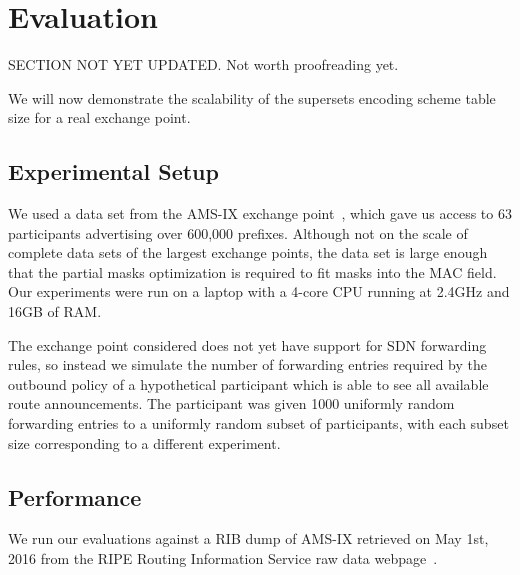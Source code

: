 \section{Evaluation}
SECTION NOT YET UPDATED. Not worth proofreading yet. 

We will now demonstrate the scalability of the supersets encoding scheme table size for a real exchange point. 

\subsection{Experimental Setup}
We used a data set from the AMS-IX exchange point~\cite{ams-ix}, which gave us access to 63 participants advertising over 600,000 prefixes. Although not on the scale of complete data sets of the largest exchange points, the data set is large enough that the partial masks optimization is required to fit masks into the MAC field. Our experiments were run on a laptop with a 4-core CPU running at 2.4GHz and 16GB of RAM.

The exchange point considered does not yet have support for SDN forwarding rules, so instead we simulate the number of forwarding entries required by the outbound policy of a hypothetical participant which is able to see all available route announcements. The participant was given 1000 uniformly random forwarding entries to a uniformly random subset of participants, with each subset size corresponding to a different experiment. 

\subsection{Performance}
We run our evaluations against a RIB dump of AMS-IX retrieved on May 1st, 2016 from the RIPE Routing Information Service raw data webpage~\cite{ris}.

